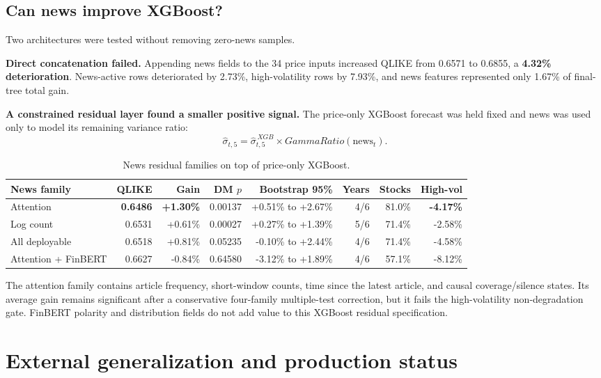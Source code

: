 \documentclass[10pt]{article}
\newcommand{\negative}[1]{\textbf{\textcolor{WarnRed}{#1}}}
\begin{document}
\subsection{Can news improve XGBoost?}

Two architectures were tested without removing zero-news samples.

\textbf{Direct concatenation failed.}
Appending news fields to the 34 price inputs increased QLIKE from 0.6571 to
0.6855, a \negative{4.32\% deterioration}. News-active rows deteriorated by
2.73\%, high-volatility rows by 7.93\%, and news features represented only
1.67\% of final-tree total gain.

\textbf{A constrained residual layer found a smaller positive signal.}
The price-only XGBoost forecast was held fixed and news was used only to model
its remaining variance ratio:
\[
\widehat{\sigma}_{t,5}
=
\widehat{\sigma}^{\,XGB}_{t,5}
\times
GammaRatio(\text{news}_{t}).
\]

\begin{table}[ht]
\centering
\caption{News residual families on top of price-only XGBoost.}
\scriptsize
\begin{tabular}{lrrrrrrr}
\toprule
News family & QLIKE & Gain & DM \(p\) & Bootstrap 95\% & Years & Stocks & High-vol \\
\midrule
Attention
  & \textbf{0.6486} & \textbf{+1.30\%} & 0.00137 & +0.51\% to +2.67\% & 4/6 & 81.0\% & \negative{-4.17\%} \\
Log count
  & 0.6531 & +0.61\% & 0.00027 & +0.27\% to +1.39\% & 5/6 & 71.4\% & -2.58\% \\
All deployable
  & 0.6518 & +0.81\% & 0.05235 & -0.10\% to +2.44\% & 4/6 & 71.4\% & -4.58\% \\
Attention + FinBERT
  & 0.6627 & -0.84\% & 0.64580 & -3.12\% to +1.89\% & 4/6 & 57.1\% & -8.12\% \\
\bottomrule
\end{tabular}
\end{table}

The attention family contains article frequency, short-window counts, time
since the latest article, and causal coverage/silence states. Its average gain
remains significant after a conservative four-family multiple-test correction,
but it fails the high-volatility non-degradation gate. FinBERT polarity and
distribution fields do not add value to this XGBoost residual specification.

\section{External generalization and production status}
\end{document}
